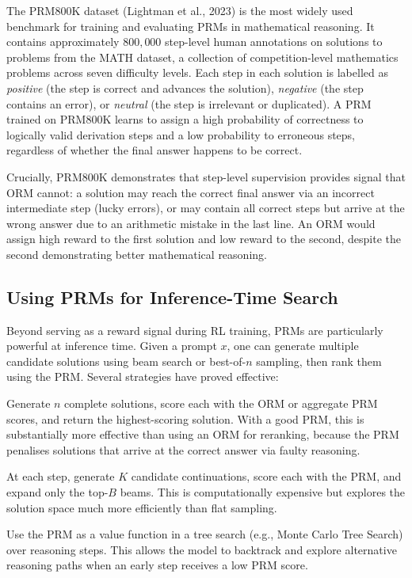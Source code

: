 \begin{example}
\label{ex:prm800k}
The PRM800K dataset (Lightman et al., 2023) is the most widely used benchmark for training and evaluating PRMs in mathematical reasoning. It contains approximately $800{,}000$ step-level human annotations on solutions to problems from the MATH dataset, a collection of competition-level mathematics problems across seven difficulty levels. Each step in each solution is labelled as \emph{positive} (the step is correct and advances the solution), \emph{negative} (the step contains an error), or \emph{neutral} (the step is irrelevant or duplicated). A PRM trained on PRM800K learns to assign a high probability of correctness to logically valid derivation steps and a low probability to erroneous steps, regardless of whether the final answer happens to be correct.

Crucially, PRM800K demonstrates that step-level supervision provides signal that ORM cannot: a solution may reach the correct final answer via an incorrect intermediate step (lucky errors), or may contain all correct steps but arrive at the wrong answer due to an arithmetic mistake in the last line. An ORM would assign high reward to the first solution and low reward to the second, despite the second demonstrating better mathematical reasoning.
\end{example}

\subsection{Using PRMs for Inference-Time Search}

Beyond serving as a reward signal during RL training, PRMs are particularly powerful at inference time. Given a prompt $x$, one can generate multiple candidate solutions using beam search or best-of-$n$ sampling, then rank them using the PRM. Several strategies have proved effective:

\begin{description}[leftmargin=!,labelwidth=3.5cm]
  \item[Best-of-$n$ reranking] Generate $n$ complete solutions, score each with the ORM or aggregate PRM scores, and return the highest-scoring solution. With a good PRM, this is substantially more effective than using an ORM for reranking, because the PRM penalises solutions that arrive at the correct answer via faulty reasoning.
  \item[Step-level beam search] At each step, generate $K$ candidate continuations, score each with the PRM, and expand only the top-$B$ beams. This is computationally expensive but explores the solution space much more efficiently than flat sampling.
  \item[Process reward guided tree search] Use the PRM as a value function in a tree search (e.g., Monte Carlo Tree Search) over reasoning steps. This allows the model to backtrack and explore alternative reasoning paths when an early step receives a low PRM score.
\end{description}

